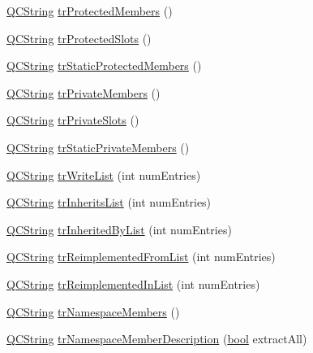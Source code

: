 \begin{DoxyCompactItemize}
\item 
\hyperlink{class_q_c_string}{Q\+C\+String} \hyperlink{class_translator_dutch_a924b8f5b7e84e0b40a7a8d4744aefc5d}{tr\+Protected\+Members} ()
\item 
\hyperlink{class_q_c_string}{Q\+C\+String} \hyperlink{class_translator_dutch_a4aa5ef7994cacfbc0df4caf30ef3cf6a}{tr\+Protected\+Slots} ()
\item 
\hyperlink{class_q_c_string}{Q\+C\+String} \hyperlink{class_translator_dutch_af1cf5f04f7e0c477ed23bfae810ea7ba}{tr\+Static\+Protected\+Members} ()
\item 
\hyperlink{class_q_c_string}{Q\+C\+String} \hyperlink{class_translator_dutch_aaa630cb62e114f10e68d8e13baa715f7}{tr\+Private\+Members} ()
\item 
\hyperlink{class_q_c_string}{Q\+C\+String} \hyperlink{class_translator_dutch_a4b1d79eb165c9e2cb0849351f6103969}{tr\+Private\+Slots} ()
\item 
\hyperlink{class_q_c_string}{Q\+C\+String} \hyperlink{class_translator_dutch_aba6f6b6b270f09b4b4907ecae39d447b}{tr\+Static\+Private\+Members} ()
\item 
\hyperlink{class_q_c_string}{Q\+C\+String} \hyperlink{class_translator_dutch_aa1506536e6b506bd806900326a92cde2}{tr\+Write\+List} (int num\+Entries)
\item 
\hyperlink{class_q_c_string}{Q\+C\+String} \hyperlink{class_translator_dutch_af3751d5796471c476070e62d455246b6}{tr\+Inherits\+List} (int num\+Entries)
\item 
\hyperlink{class_q_c_string}{Q\+C\+String} \hyperlink{class_translator_dutch_a2e1270963a6ac75701cad5e9a5ddbf92}{tr\+Inherited\+By\+List} (int num\+Entries)
\item 
\hyperlink{class_q_c_string}{Q\+C\+String} \hyperlink{class_translator_dutch_a70c0d401a727cace424b53ffa0599eab}{tr\+Reimplemented\+From\+List} (int num\+Entries)
\item 
\hyperlink{class_q_c_string}{Q\+C\+String} \hyperlink{class_translator_dutch_a7bfba9ec083ef502af403578a65b2cba}{tr\+Reimplemented\+In\+List} (int num\+Entries)
\item 
\hyperlink{class_q_c_string}{Q\+C\+String} \hyperlink{class_translator_dutch_a0a67ae237b8835cfc17e31b84d9ba1d8}{tr\+Namespace\+Members} ()
\item 
\hyperlink{class_q_c_string}{Q\+C\+String} \hyperlink{class_translator_dutch_a76c136bcd3da1ec4d9bd0d3afda3864b}{tr\+Namespace\+Member\+Description} (\hyperlink{qglobal_8h_a1062901a7428fdd9c7f180f5e01ea056}{bool} extract\+All)
\item 

\end{DoxyCompactItemize}
